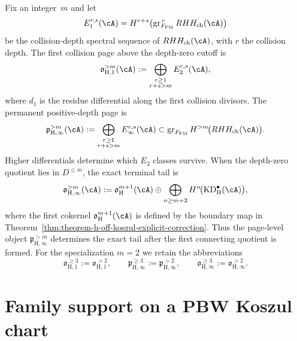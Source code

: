\begin{definition}
\label{def:theorem-h-collision-obstruction-pages}
Fix an integer~$m$ and let
\[
 E_1^{r,s}(\cA)
 =
 H^{r+s}\!\left(
  \operatorname{gr}^{\,r}_{F_{\mathrm{FM}}}
  RHH_{\mathrm{ch}}(\cA)
 \right)
\]
be the collision-depth spectral sequence of
$RHH_{\mathrm{ch}}(\cA)$, with $r$ the collision depth. The first
collision page above the depth-zero cutoff is
\[
 \mathfrak{o}_{\mathrm H,1}^{>m}(\cA)
 :=
 \bigoplus_{\substack{r\geq1\\ r+s>m}}
 E_2^{r,s}(\cA),
\]
where $d_1$ is the residue differential along the first collision
divisors. The permanent positive-depth page is
\[
 \mathfrak{p}_{\mathrm H,\infty}^{>m}(\cA)
 :=
 \bigoplus_{\substack{r\geq1\\ r+s>m}}
 E_\infty^{r,s}(\cA)
 \subset
 \operatorname{gr}_{F_{\mathrm{FM}}}
 H^{>m}\!\bigl(RHH_{\mathrm{ch}}(\cA)\bigr).
\]
Higher differentials determine which $E_2$ classes survive.  When the
depth-zero quotient lies in $D^{\leq m}$, the exact terminal tail is
\[
 \mathfrak{o}_{\mathrm H,\infty}^{>m}(\cA)
 :=
 \mathfrak{o}_{\mathrm H}^{m+1}(\cA)
 \oplus
 \bigoplus_{n\geq m+2}
 H^n\!\bigl(\mathrm{KD}_{\mathrm H}^{\bullet}(\cA)\bigr),
\]
where the first cokernel
$\mathfrak{o}_{\mathrm H}^{m+1}(\cA)$ is defined by the boundary map in
Theorem~\ref{thm:theorem-h-off-koszul-explicit-correction}. Thus the
page-level object $\mathfrak{p}_{\mathrm H,\infty}^{>m}$ determines
the exact tail after the first connecting quotient is formed.
For the specialization $m=2$ we retain the abbreviations
\[
 \mathfrak{o}_{\mathrm H,1}^{\geq3}
 :=\mathfrak{o}_{\mathrm H,1}^{>2},
 \qquad
 \mathfrak{p}_{\mathrm H,\infty}^{\geq3}
 :=\mathfrak{p}_{\mathrm H,\infty}^{>2},
 \qquad
 \mathfrak{o}_{\mathrm H,\infty}^{\geq3}
 :=\mathfrak{o}_{\mathrm H,\infty}^{>2}.
\]
\end{definition}

\section{Family support on a PBW Koszul chart}
\label{sec:theorem-h-on-koszul}

